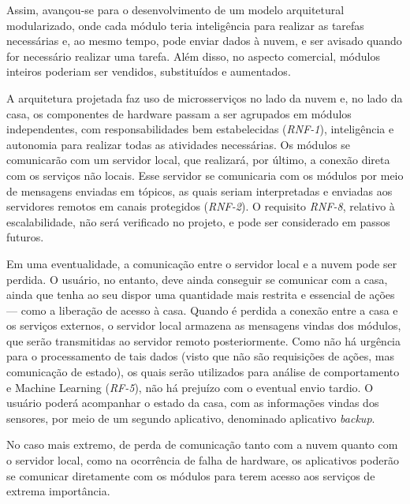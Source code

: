Assim, avançou-se para o desenvolvimento de um modelo arquitetural modularizado, onde cada módulo teria inteligência para realizar as tarefas necessárias e, ao mesmo tempo, pode enviar dados à nuvem, e ser avisado quando for necessário realizar uma tarefa. Além disso, no aspecto comercial, módulos inteiros poderiam ser vendidos, substituídos e aumentados.

A arquitetura projetada faz uso de microsserviços no lado da nuvem e, no lado da casa, os componentes de hardware passam a ser agrupados em módulos independentes, com responsabilidades bem estabelecidas (\emph{RNF-1}), inteligência e autonomia para realizar todas as atividades necessárias. Os módulos se comunicarão com um servidor local, que realizará, por último, a conexão direta com os serviços não locais. Esse servidor se comunicaria com os módulos por meio de mensagens enviadas em tópicos, as quais seriam interpretadas e enviadas aos servidores remotos em canais protegidos (\emph{RNF-2}). O requisito \emph{RNF-8}, relativo à escalabilidade, não será verificado no projeto, e pode ser considerado em passos futuros.

Em uma eventualidade, a comunicação entre o servidor local e a nuvem pode ser perdida.  O usuário, no entanto, deve ainda conseguir se comunicar com a casa, ainda que tenha ao seu dispor uma quantidade mais restrita e essencial de ações --- como a liberação de acesso à casa. Quando é perdida a conexão entre a casa e os serviços externos, o servidor local armazena as mensagens vindas dos módulos, que serão transmitidas ao servidor remoto posteriormente. Como não há urgência para o processamento de tais dados (visto que não são requisições de ações, mas comunicação de estado), os quais serão utilizados para análise de comportamento e Machine Learning (\emph{RF-5}), não há prejuízo com o eventual envio tardio. O usuário poderá acompanhar o estado da casa, com as informações vindas dos sensores, por meio de um segundo aplicativo, denominado aplicativo \emph{backup}.

No caso mais extremo, de perda de comunicação tanto com a nuvem quanto com o servidor local, como na ocorrência de falha de hardware, os aplicativos poderão se comunicar diretamente com os módulos para terem acesso aos serviços de extrema importância.
